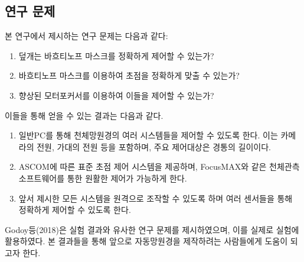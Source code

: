 \subsection{연구 문제}

본 연구에서 제시하는 연구 문제는 다음과 같다:
\begin{enumerate}
	
	\item 덮개는 바흐티노프 마스크를 정확하게 제어할 수 있는가?
	\item 바흐티노프 마스크를 이용하여 초점을 정확하게 맞출 수 있는가?
	\item 향상된 모터포커서를 이용하여 이들을 제어할 수 있는가?
	
\end{enumerate}
이들을 통해 얻을 수 있는 결과는 다음과 같다.

\begin{enumerate}
	
	\item 일반PC를 통해 천체망원경의 여러 시스템들을 제어할 수 있도록 한다. 이는 카메라의 전원, 가대의 전원 등을 포함하며, 주요 제어대상은 경통의 길이이다.
	\item ASCOM에 따른 표준 초점 제어 시스템을 제공하며, FocusMAX와 같은 천체관측 소프트웨어를 통한 원활한 제어가 가능하게 한다.
	\item 앞서 제시한 모든 시스템을 원격으로 조작할 수 있도록 하며 여러 센서들을 통해 정확하게 제어할 수 있도록 한다.
\end{enumerate}	

Godoy등(2018)은 실험 결과와 유사한 연구 문제를 제시하였으며\cite{godoy2018control}, 이를 실제로 실험에 활용하였다. 본 결과들을 통해 앞으로 자동망원경을 제작하려는 사람들에게 도움이 되고자 한다.